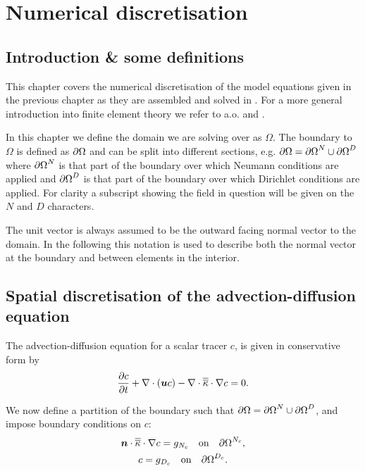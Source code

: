\chapter{Numerical discretisation}\label{chap:numerical_discretisation}
\section{Introduction \& some definitions}\label{sec:ND_Intro}
This chapter covers the numerical discretisation of the model equations
given in the previous chapter as they are assembled and solved 
in \fluidity. For a more general introduction into finite element theory
we refer to a.o. \cite{elman2005} and \cite{gresho1988}.

In this chapter we define the domain we are solving over as $\Omega$. The boundary to
$\Omega$ is defined as ${\partial\Omega}$
and can be split into different sections, e.g.
$\partial\Omega = {\partial\Omega}^{N}\cup {\partial\Omega}^{D}$
where ${\partial\Omega}^{N}$ is that part of the boundary over
which Neumann conditions are applied and ${\partial\Omega}^{D}$ is that part of the boundary over
which Dirichlet conditions are applied. For clarity a subscript showing the field in question will
be given on the $N$ and $D$ characters.

The unit vector  is always assumed to be the
outward facing normal vector to the domain.
In the following this notation is used to describe both the normal vector at the boundary
and between elements in the interior.

\section{Spatial discretisation of the advection-diffusion equation}
\label{sec:ND_advection_diffusion_discretisation}

The advection-diffusion equation for a scalar tracer $c$,
is given in conservative form by
\begin{equation}\label{eq:advdif}
  \frac{\partial c}{\partial t} + \nabla\cdot\left({\mbox{\boldmath$u$}} c\right) - \nabla\cdot\overline{\overline{\kappa}}\cdot\nabla c = 0.
\end{equation}

We now define a partition of the boundary such that
$\partial\Omega = {\partial\Omega}^{N}\cup {\partial\Omega}^{D}$, and impose boundary conditions on $c$:
\begin{gather}
  \label{eq:cboundary}
  {\mbox{\boldmath$n$}}\cdot\overline{\overline{\kappa}}\cdot\nabla c=g_{N_c} \quad\textrm{on}\quad {\partial\Omega}^{N_c},\\
  c=g_{D_c} \quad\textrm{on}\quad {\partial\Omega}^{D_c}.
\end{gather}

